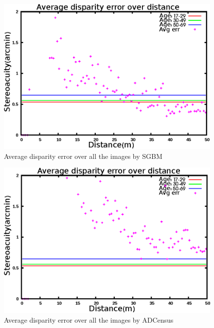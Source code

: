 \begin{figure}[H]
\centering
\includegraphics[scale=0.8]{sgbmmsk1000}
\caption{Average disparity error over all the images by SGBM}
\label{fig:mskmapsgbm}
\end{figure} 

\begin{figure}[H]
\centering
\includegraphics[scale=0.8]{adcenmsk1000}
\caption{Average disparity error over all the images by ADCensus}
\label{fig:mskmapadc}
\end{figure} 

